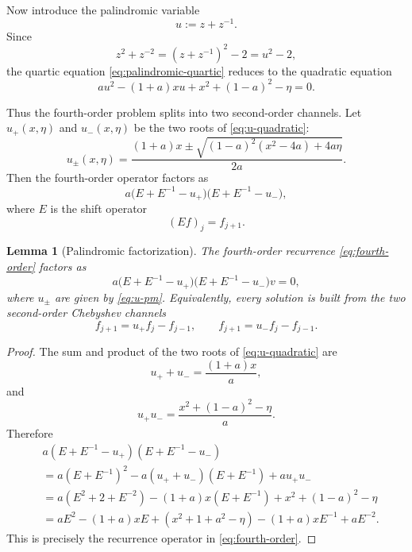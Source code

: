 \documentclass[11pt]{amsart}
\numberwithin{equation}{section}
\newtheorem{lemma}[theorem]{Lemma}
\begin{document}
Now introduce the palindromic variable
\[
        u:=z+z^{-1}.
\]
Since
\[
        z^2+z^{-2}
        =
        (z+z^{-1})^2-2
        =
        u^2-2,
\]
the quartic equation \eqref{eq:palindromic-quartic} reduces to the quadratic
equation
\begin{equation}\label{eq:u-quadratic}
        a u^2-(1+a)x u+x^2+(1-a)^2-\eta=0.
\end{equation}

Thus the fourth-order problem splits into two second-order channels.  Let
\(u_+(x,\eta)\) and \(u_-(x,\eta)\) be the two roots of
\eqref{eq:u-quadratic}:
\begin{equation}\label{eq:u-pm}
        u_\pm(x,\eta)
        =
        \frac{
        (1+a)x
        \pm
        \sqrt{(1-a)^2(x^2-4a)+4a\eta}
        }{2a}.
\end{equation}
Then the fourth-order operator factors as
\begin{equation}\label{eq:operator-factorization}
        a\bigl(E+E^{-1}-u_+\bigr)
         \bigl(E+E^{-1}-u_-\bigr),
\end{equation}
where \(E\) is the shift operator
\[
        (Ef)_j=f_{j+1}.
\]

\begin{lemma}[Palindromic factorization]
The fourth-order recurrence \eqref{eq:fourth-order} factors as
\[
        a\bigl(E+E^{-1}-u_+\bigr)
         \bigl(E+E^{-1}-u_-\bigr)v=0,
\]
where \(u_\pm\) are given by \eqref{eq:u-pm}.  Equivalently, every solution
is built from the two second-order Chebyshev channels
\[
        f_{j+1}=u_+ f_j-f_{j-1},
        \qquad
        f_{j+1}=u_- f_j-f_{j-1}.
\]
\end{lemma}

\begin{proof}
The sum and product of the two roots of \eqref{eq:u-quadratic} are
\[
        u_++u_-=\frac{(1+a)x}{a},
\]
and
\[
        u_+u_-=\frac{x^2+(1-a)^2-\eta}{a}.
\]
Therefore
\[
\begin{aligned}
&a(E+E^{-1}-u_+)(E+E^{-1}-u_-)                         \\
&=
a(E+E^{-1})^2
-a(u_++u_-)(E+E^{-1})
+au_+u_-                                                 \\
&=
a(E^2+2+E^{-2})
-(1+a)x(E+E^{-1})
+x^2+(1-a)^2-\eta                                        \\
&=
aE^2-(1+a)xE+(x^2+1+a^2-\eta)
-(1+a)xE^{-1}+aE^{-2}.
\end{aligned}
\]
This is precisely the recurrence operator in \eqref{eq:fourth-order}.
\end{proof}
\end{document}
